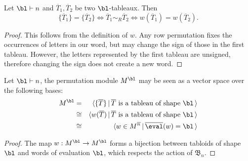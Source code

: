 \documentclass[11pt]{report}
\begin{document}
\begin{lemma}
	Let $\bl \vdash n$ and $\overline{T}_{1}, \overline{T}_{2}$ be two $\bl$-tableaux. Then
	\[\{\overline{T}_{1}\} = \{\overline{T}_{2}\}  \Leftrightarrow \overline{T}_{1} \sim_{R} \overline{T}_{2} \Leftrightarrow w(\overline{T}_{1}) = w(\overline{T}_{2}).\]
\end{lemma}
\begin{proof}
	This follows from the definition of $w$. Any row permutation fixes the occurrences of letters in our word, but may change the sign of those in the first tableau. However, the letters represented by the first tableau are unsigned, therefore changing the sign does not create a new word.
\end{proof}

\begin{lemma}
	Let $\bl \vdash n$, the permutation module $M^{\bl}$  may be seen as a vector 
	space over the following bases:
	\begin{eqnarray*}
		M^{\bl} & = & \langle \{\overline{T}\} \,|\, \overline{T} \textnormal{ is a tableau of 
			shape 
		} 	\bl \, \rangle \\
		& \cong & \langle w(\overline{T}) \, | \,\overline{T} \textnormal{ is a tableau of shape } 	
		\bl \,\rangle \\ 
		& \cong & \langle w \in M^{\overline{n}} \, | \,\overline{\eval}(w) = \bl \, \rangle
	\end{eqnarray*}  
\end{lemma}
\begin{proof}
	The map $w: M^{\bl} \to M^{\bl}$ forms a bijection between tabloids of shape $\bl$ and 
	words of evaluation $\bl$, which respects the action of $\mathfrak{B}_{n}$.	
\end{proof}
\end{document}

